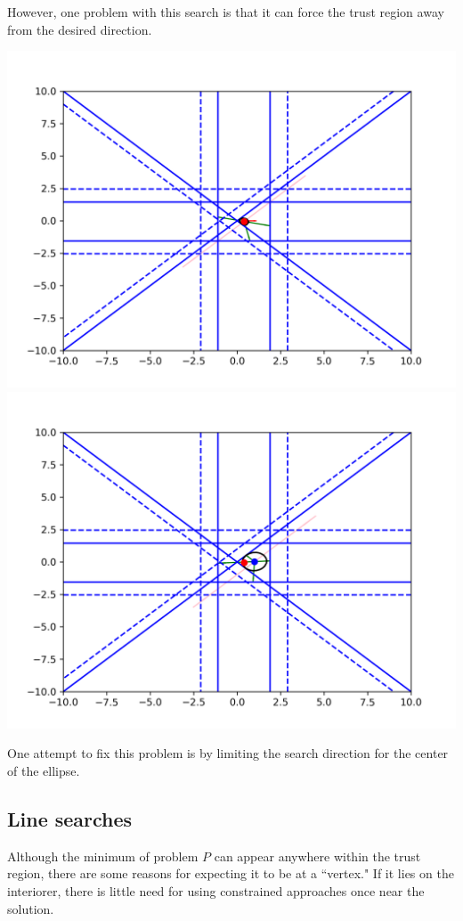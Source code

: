 \documentclass{article}
\begin{document}
However, one problem with this search is that it can force the trust region away from the desired direction.

\includegraphics[scale=0.2]{everything_runs_1.png}
\includegraphics[scale=0.2]{everything_runs_2.png}


One attempt to fix this problem is by limiting the search direction for the center of the ellipse.

\subsection{Line searches}
Although the minimum of problem $P$ can appear anywhere within the trust region, there are some reasons for expecting it to be at a ``vertex."
If it lies on the interiorer, there is little need for using constrained approaches once near the solution.
\end{document}
